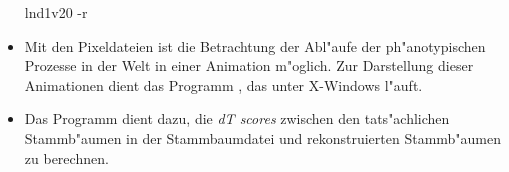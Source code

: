 \begin{appendix}
\begin{itemize}
\begin{verbatimcmd}
lnd1v20 -r 
\end{verbatimcmd}

\item Mit den Pixeldateien ist die Betrachtung der Abl"aufe der ph"anotypischen Prozesse in der Welt
in einer Animation m"oglich. Zur Darstellung dieser Animationen dient das Programm ,
das unter X-Windows l"auft.

\item Das Programm  dient dazu, die \textsl{dT scores} zwischen den tats"achlichen Stammb"aumen
in der Stammbaumdatei und rekonstruierten Stammb"aumen zu berechnen.

\end{itemize}


\end{appendix}
